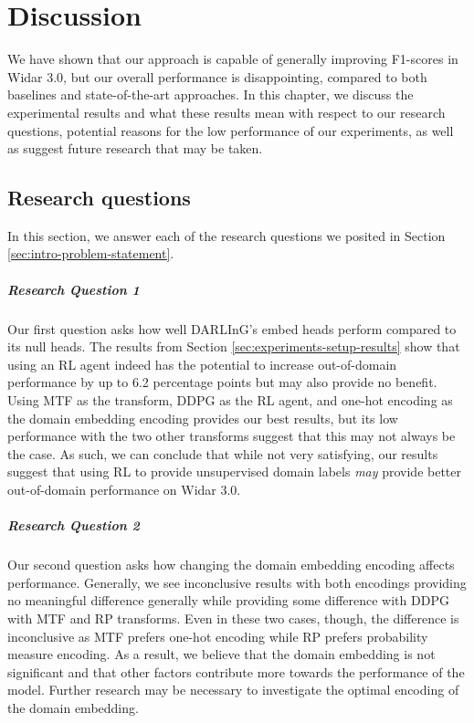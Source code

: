 \chapter{Discussion}

We have shown that our approach is capable of generally improving F1-scores in Widar 3.0, but our overall performance is disappointing, compared to both baselines and state-of-the-art approaches.
In this chapter, we discuss the experimental results and what these results mean with respect to our research questions, potential reasons for the low performance of our experiments, as well as suggest future research that may be taken.

\section{Research questions}

In this section, we answer each of the research questions we posited in Section \ref{sec:intro-problem-statement}.

\paragraph{Research Question 1}
Our first question asks how well DARLInG's embed heads perform compared to its null heads.
The results from Section \ref{sec:experiments-setup-results} show that using an RL agent indeed has the potential to increase out-of-domain performance by up to 6.2 percentage points but may also provide no benefit.
Using MTF as the transform, DDPG as the RL agent, and one-hot encoding as the domain embedding encoding provides our best results, but its low performance with the two other transforms suggest that this may not always be the case.
As such, we can conclude that while not very satisfying, our results suggest that using RL to provide unsupervised domain labels \textit{may} provide better out-of-domain performance on Widar 3.0.

\paragraph{Research Question 2}
Our second question asks how changing the domain embedding encoding affects performance.
Generally, we see inconclusive results with both encodings providing no meaningful difference generally while providing some difference with DDPG with MTF and RP transforms.
Even in these two cases, though, the difference is inconclusive as MTF prefers one-hot encoding while RP prefers probability measure encoding.
As a result, we believe that the domain embedding is not significant and that other factors contribute more towards the performance of the model.
Further research may be necessary to investigate the optimal encoding of the domain embedding.

